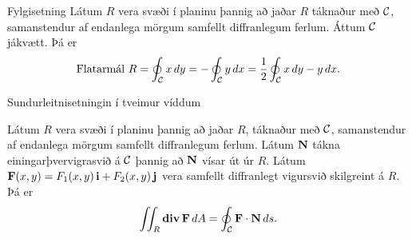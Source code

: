 \begin{frame}{} 

\begin {block}{Fylgisetning \rtask{}}
 Látum $R$ vera svæði í planinu þannig að
jaðar $R$ táknaður með $\cal C$, 
samanstendur af endanlega mörgum samfellt diffranlegum
ferlum.  Áttum $\cal C$ jákvætt. 
Þá er 
$$\mbox{Flatarmál } R=\oint_{\cal C}x\,dy= 
-\oint_{\cal C}y\,dx=\frac{1}{2}\oint_{\cal C}x\,dy-y\,dx.$$
\end{block}

\end{frame}



\begin{frame}{} 

\begin {block}{Sundurleitnisetningin í tveimur víddum \rtask{}}

Látum $R$ vera svæði í planinu þannig að
jaðar $R$, táknaður með $\cal C$,  
samanstendur af endanlega mörgum samfellt diffranlegum
ferlum.  Látum $\mbox{${\bf N}$}$ tákna einingarþvervigrasvið á $\cal C$ þannig að
$\mbox{${\bf N}$}$ vísar út úr $R$.  Látum
$\mbox{${\bf F}$}(x,y)=F_1(x,y)\,\mbox{${\bf i}$}+F_2(x,y)\,\mbox{${\bf j}$}$ vera samfellt diffranlegt
vigursvið skilgreint á $R$.  Þá er 
$$\int\!\!\!\int_R\mbox{${\rm\bf div\,}$} \mbox{${\bf F}$}\,dA=\oint_{\cal C} \mbox{${\bf F}$}\cdot\mbox{${\bf N}$}\,ds.$$
\end{block}

\end{frame}
